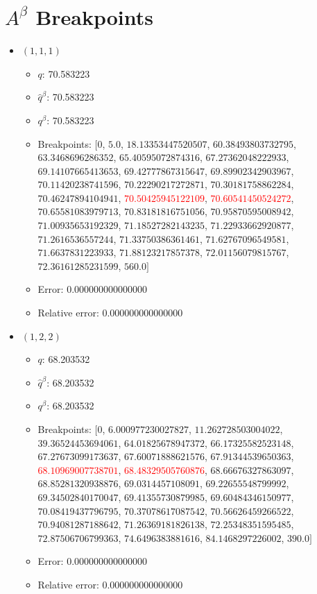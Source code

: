 \documentclass{article}%
\begin{document}
\section{$A^\beta$ Breakpoints}%
\thispagestyle{plain}%
\begin{itemize}%
	\item $(1, 1, 1)$%
	\begin{itemize}%
		\item $q$: 70.583223%
		\item $\hat{q}^\beta$: 70.583223%
		\item $q^\beta$: 70.583223%
		\item Breakpoints: $[$$0$, $5.0$, $18.13353447520507$, $60.38493803732795$, $63.3468696286352$, $65.40595072874316$, $67.27362048222933$, $69.14107665413653$, $69.42777867315647$, $69.89902342903967$, $70.11420238741596$, $70.22290217272871$, $70.30181758862284$, $70.46247894104941$, \textcolor{red}{$70.50425945122109$}, \textcolor{red}{$70.60541450524272$}, $70.65581083979713$, $70.83181816751056$, $70.95870595008942$, $71.00935653192329$, $71.18527282143235$, $71.22933662920877$, $71.2616536557244$, $71.33750386361461$, $71.62767096549581$, $71.6637831223933$, $71.88123217857378$, $72.01156079815767$, $72.36161285231599$, $560.0$$]$%
		\item Error: 0.000000000000000%
		\item Relative error: 0.000000000000000%
	\end{itemize}%
	\item $(1, 2, 2)$%
	\begin{itemize}%
		\item $q$: 68.203532%
		\item $\hat{q}^\beta$: 68.203532%
		\item $q^\beta$: 68.203532%
		\item Breakpoints: $[$$0$, $6.000977230027827$, $11.262728503004022$, $39.36524453694061$, $64.01825678947372$, $66.17325582523148$, $67.27673099173637$, $67.60071888621576$, $67.91344539650363$, \textcolor{red}{$68.10969007738701$}, \textcolor{red}{$68.48329505760876$}, $68.66676327863097$, $68.85281320938876$, $69.0314457108091$, $69.22655548799992$, $69.34502840170047$, $69.41355730879985$, $69.60484346150977$, $70.08419437796795$, $70.37078617087542$, $70.56626459266522$, $70.94081287188642$, $71.26369181826138$, $72.25348351595485$, $72.87506706799363$, $74.6496383881616$, $84.1468297226002$, $390.0$$]$%
		\item Error: 0.000000000000000%
		\item Relative error: 0.000000000000000%

\end{itemize}
\end{itemize}
\end{document}
